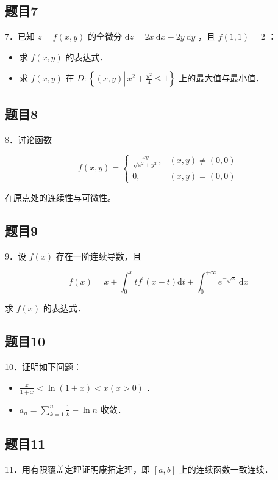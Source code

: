 \documentclass{article}
\begin{document}
\subsection{题目7}
7．已知 \(z=f(x, y)\) 的全微分 \(\mathrm{d} z=2 x \mathrm{~d} x-2 y \mathrm{~d} y\) ，且 \(f(1,1)=2\) ：

\begin{itemize}
  \item[（1）] 求 \(f(x, y)\) 的表达式．
  \item[（2）] 求 \(f(x, y)\) 在 \(D:\left\{(x, y) \left\lvert\, x^{2}+\frac{y^{2}}{4} \leq 1\right.\right\}\) 上的最大值与最小值．
\end{itemize}

\subsection{题目8}
8．讨论函数

\[
f(x, y)= \begin{cases}\frac{x y}{\sqrt{x^{2}+y^{2}}}, & (x, y) \neq(0,0) \\ 0, & (x, y)=(0,0)\end{cases}
\]

在原点处的连续性与可微性。

\subsection{题目9}
9．设 \(f(x)\) 存在一阶连续导数，且

\[
f(x)=x+\int_{0}^{x} t f^{\prime}(x-t) \mathrm{d} t+\int_{0}^{+\infty} e^{-\sqrt{x}} \mathrm{~d} x
\]

求 \(f(x)\) 的表达式．

\subsection{题目10}
10．证明如下问题：

\begin{itemize}
  \item[（1）] \(\frac{x}{1+x}<\ln (1+x)<x(x>0)\) ．
  \item[（2）] \(a_{n}=\sum_{k=1}^{n} \frac{1}{k}-\ln n\) 收敛．
\end{itemize}

\subsection{题目11}
11．用有限覆盖定理证明康拓定理，即 \([a, b]\) 上的连续函数一致连续．
\end{document}
